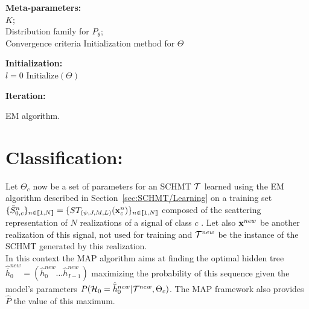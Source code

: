 \documentclass[a4paper,11pt]{report}
\begin{document}
			\begin{center}
				\begin{algorithm}
					\textbf{Meta-parameters:}\\
						$K$;\\
						Distribution family for $P_{\theta}$;\\
						Convergence criteria 
						Initialization method for $\Theta$ 
						
					\textbf{Initialization:}\\
						$l=0$ 
						$\text{Initialize}(\Theta)$
					
					\textbf{Iteration:}\\
					\caption{EM algorithm.}
					\label{algo:EM}
				\end{algorithm}        
			\end{center}
			    
  \section{Classification:}
    \label{sec:SCHMT/Clf}
    
    Let $\Theta_{c}$ now be a set of parameters for an SCHMT $\mathcal{T}$ learned using the EM algorithm described in Section~\ref{sec:SCHMT/Learning} on a training set $\{\bar{S}_{0,c}^n\}_{n \in \llbracket1, N \rrbracket} = \{ST_{(\psi, J, M, L)}({\bf x}_{c}^{n})\}_{n \in \llbracket1, N \rrbracket}$ composed of the scattering representation of $N$ realizations of a signal of class $c$ . Let also ${\bf x}^{new}$ be another realization of this signal, not used for training and $\mathcal{T}^{new}$ be the instance of the SCHMT generated by this realization.\\
    
    In this context the MAP algorithm aims at finding the optimal hidden tree $\hat{\bar{h}}_{0}^{new}=(\hat{h}_{0}^{new} \dots \hat{h}_{I-1}^{new})$ maximizing the probability of this sequence given the model's parameters $P(\mathcal{H}_{0}= \hat{\bar{h}}_{0}^{new}|\mathcal{T}^{new},\Theta_{c})$. The MAP framework also provides $\hat{P}$ the value of this maximum.\\
    
\end{document}
